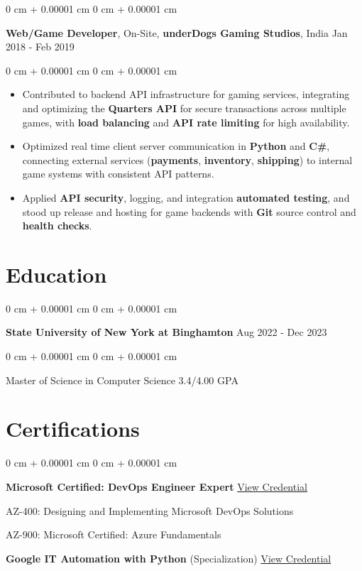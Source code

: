 \documentclass[10pt, letterpaper]{article}
\newenvironment{highlights}{
    \begin{itemize}[
        topsep=0.02 cm,
        parsep=0.02 cm,
        partopsep=0pt,
        itemsep=0pt,
        leftmargin=0 cm + 10pt
    ]
}{
    \end{itemize}
} %
\newenvironment{onecolentry}{
    \begin{adjustwidth}{
        0 cm + 0.00001 cm
    }{
        0 cm + 0.00001 cm
    }
}{
    \end{adjustwidth}
} %
\newcommand{\resumeheading}[2]{%
    \begin{onecolentry}
        #1 \hfill #2
    \end{onecolentry}
} %
\begin{document}
\vspace{0.12 cm}
\resumeheading{\textbf{Web/Game Developer}, On-Site, \textbf{underDogs Gaming Studios}, India}{Jan 2018 - Feb 2019}

\begin{onecolentry}
\begin{highlights}
	\item Contributed to backend API infrastructure for gaming services, integrating and optimizing the \textbf{Quarters API} for secure transactions across multiple games, with \textbf{load balancing} and \textbf{API rate limiting} for high availability.
	\item Optimized real time client server communication in \textbf{Python} and \textbf{C\#}, connecting external services (\textbf{payments}, \textbf{inventory}, \textbf{shipping}) to internal game systems with consistent API patterns.
	\item Applied \textbf{API security}, logging, and integration \textbf{automated testing}, and stood up release and hosting for game backends with \textbf{Git} source control and \textbf{health checks}.
\end{highlights}
\end{onecolentry}



\vspace{0.2 cm}

\section{Education}

\resumeheading{\textbf{State University of New York at Binghamton}}{Aug 2022 - Dec 2023}

\begin{onecolentry}
	Master of Science in Computer Science \hfill 3.4/4.00 GPA
\end{onecolentry}

\vspace{0.2 cm}

\section{Certifications}

\begin{onecolentry}
	\textbf{Microsoft Certified: DevOps Engineer Expert} \hfill \href{https://drive.google.com/file/d/1AjPcmWMrnxSNEUaSC6XzCVqHik7d5M1M/view?usp=drive_link}{View Credential}

	AZ-400: Designing and Implementing Microsoft DevOps Solutions

	AZ-900: Microsoft Certified: Azure Fundamentals

	\textbf{Google IT Automation with Python} (Specialization) \hfill \href{https://www.coursera.org/account/accomplishments/specialization/certificate/59YMRC67LBUQ}{View Credential}
\end{onecolentry}
\end{document}
